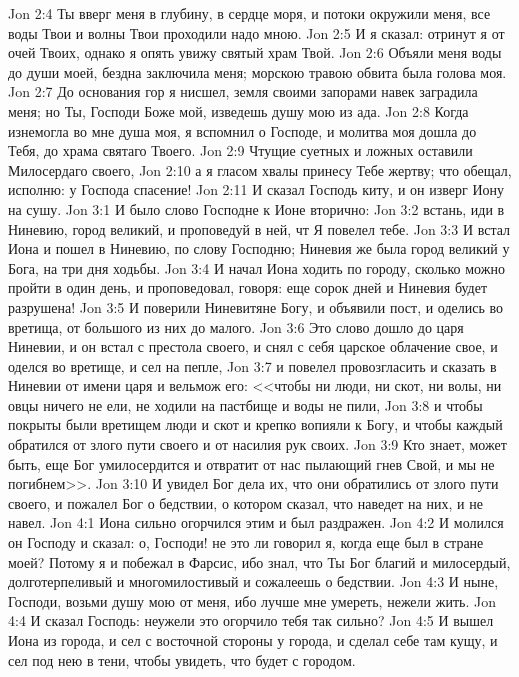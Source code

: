 \vs Jon 2:4 Ты вверг меня в глубину, в сердце моря, и потоки окружили меня, все воды Твои и волны Твои проходили надо мною.
\vs Jon 2:5 И я сказал: отринут я от очей Твоих, однако я опять увижу святый храм Твой.
\vs Jon 2:6 Объяли меня воды до души моей, бездна заключила меня; морскою травою обвита была голова моя.
\vs Jon 2:7 До основания гор я нисшел, земля своими запорами навек заградила меня; но Ты, Господи Боже мой, изведешь душу мою из ада.
\vs Jon 2:8 Когда изнемогла во мне душа моя, я вспомнил о Господе, и молитва моя дошла до Тебя, до храма святаго Твоего.
\vs Jon 2:9 Чтущие суетных и ложных  оставили Милосердаго своего,
\vs Jon 2:10 а я гласом хвалы принесу Тебе жертву; что обещал, исполню: у Господа спасение!
\vs Jon 2:11 И сказал Господь киту, и он изверг Иону на сушу.
\vs Jon 3:1 И было слово Господне к Ионе вторично:
\vs Jon 3:2 встань, иди в Ниневию, город великий, и проповедуй в ней, чт Я повелел тебе.
\vs Jon 3:3 И встал Иона и пошел в Ниневию, по слову Господню; Ниневия же была город великий у Бога, на три дня ходьбы.
\vs Jon 3:4 И начал Иона ходить по городу, сколько можно пройти в один день, и проповедовал, говоря: еще сорок дней и Ниневия будет разрушена!
\vs Jon 3:5 И поверили Ниневитяне Богу, и объявили пост, и оделись во вретища, от большого из них до малого.
\vs Jon 3:6 Это слово дошло до царя Ниневии, и он встал с престола своего, и снял с себя царское облачение свое, и оделся во вретище, и сел на пепле,
\vs Jon 3:7 и повелел провозгласить и сказать в Ниневии от имени царя и вельмож его: <<чтобы ни люди, ни скот, ни волы, ни овцы ничего не ели, не ходили на пастбище и воды не пили,
\vs Jon 3:8 и чтобы покрыты были вретищем люди и скот и крепко вопияли к Богу, и чтобы каждый обратился от злого пути своего и от насилия рук своих.
\vs Jon 3:9 Кто знает, может быть, еще Бог умилосердится и отвратит от нас пылающий гнев Свой, и мы не погибнем>>.
\vs Jon 3:10 И увидел Бог дела их, что они обратились от злого пути своего, и пожалел Бог о бедствии, о котором сказал, что наведет на них, и не навел.
\vs Jon 4:1 Иона сильно огорчился этим и был раздражен.
\vs Jon 4:2 И молился он Господу и сказал: о, Господи! не это ли говорил я, когда еще был в стране моей? Потому я и побежал в Фарсис, ибо знал, что Ты Бог благий и милосердый, долготерпеливый и многомилостивый и сожалеешь о бедствии.
\vs Jon 4:3 И ныне, Господи, возьми душу мою от меня, ибо лучше мне умереть, нежели жить.
\vs Jon 4:4 И сказал Господь: неужели это огорчило тебя так сильно?
\vs Jon 4:5 И вышел Иона из города, и сел с восточной стороны у города, и сделал себе там кущу, и сел под нею в тени, чтобы увидеть, что будет с городом.
